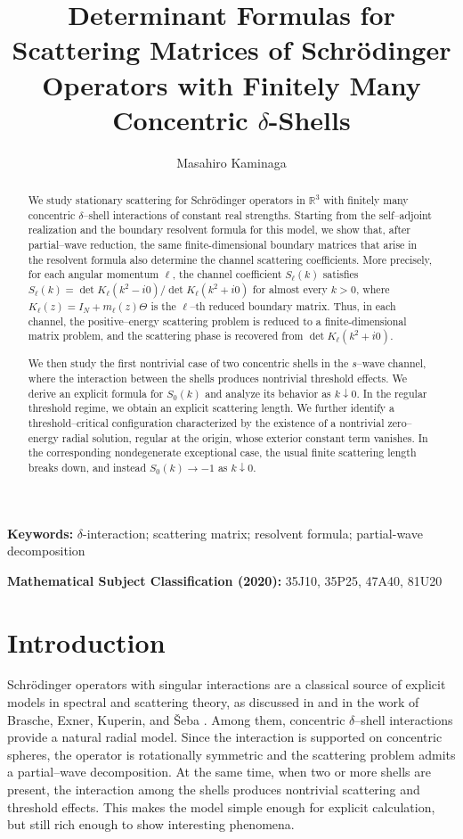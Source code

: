 \documentclass[a4paper,11pt]{article}
\title{Determinant Formulas for Scattering Matrices of Schr\"odinger Operators with Finitely Many Concentric $\delta$-Shells}
\author{Masahiro Kaminaga}
\date{}
\numberwithin{equation}{section}
\newcommand{\R}{\mathbb{R}}
\theoremstyle{definition}
\theoremstyle{remark}
\begin{document}
\maketitle

\noindent\textbf{Keywords:} $\delta$-interaction; scattering matrix; resolvent formula; partial-wave decomposition

\noindent\textbf{Mathematical Subject Classification (2020):} 35J10, 35P25, 47A40, 81U20

\begin{abstract}
We study stationary scattering for Schr\"odinger operators in $\R^3$ with
finitely many concentric $\delta$--shell interactions of constant real
strengths. Starting from the self--adjoint realization and the boundary
resolvent formula for this model, we show that, after partial--wave
reduction, the same finite-dimensional boundary matrices that arise in the
resolvent formula also determine the channel scattering coefficients.
More precisely, for each angular momentum $\ell$, the channel coefficient
$S_\ell(k)$ satisfies
$S_\ell(k)=\det K_\ell(k^2-i0)/\det K_\ell(k^2+i0)$ for almost every $k>0$,
where $K_\ell(z)=I_N+m_\ell(z)\Theta$ is the $\ell$--th reduced boundary
matrix. Thus, in each channel, the positive--energy scattering problem is
reduced to a finite-dimensional matrix problem, and the scattering phase is
recovered from $\det K_\ell(k^2+i0)$.

We then study the first nontrivial case of two concentric shells in the
$s$--wave channel, where the interaction between the shells produces
nontrivial threshold effects. We derive an explicit formula for $S_0(k)$
and analyze its behavior as $k\downarrow0$. In the regular threshold
regime, we obtain an explicit scattering length. We further identify a
threshold--critical configuration characterized by the existence of a
nontrivial zero--energy radial solution, regular at the origin, whose
exterior constant term vanishes. In the corresponding nondegenerate
exceptional case, the usual finite scattering length breaks down, and
instead $S_0(k)\to -1$ as $k\downarrow0$.
\end{abstract}

\section{Introduction}

Schr\"odinger operators with singular interactions are a classical source of
explicit models in spectral and scattering theory, 
as discussed in \cite{AlbeverioEtAl2005} and in
the work of Brasche, Exner, Kuperin, and \v{S}eba \cite{BrascheEtAl1994}. 
Among them, concentric
$\delta$--shell interactions provide a natural radial model. Since the
interaction is supported on concentric spheres, the operator is rotationally
symmetric and the scattering problem admits a partial--wave decomposition. At
the same time, when two or more shells are present, the interaction among the
shells produces nontrivial scattering and threshold effects. This makes the
model simple enough for explicit calculation, but still rich enough to show
interesting phenomena.
\end{document}
